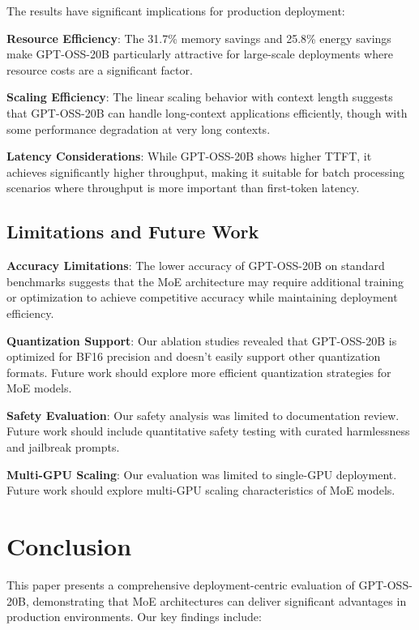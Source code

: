 \documentclass[11pt]{article}
\begin{document}
The results have significant implications for production deployment:

\textbf{Resource Efficiency}: The 31.7\% memory savings and 25.8\% energy savings make GPT-OSS-20B particularly attractive for large-scale deployments where resource costs are a significant factor.

\textbf{Scaling Efficiency}: The linear scaling behavior with context length suggests that GPT-OSS-20B can handle long-context applications efficiently, though with some performance degradation at very long contexts.

\textbf{Latency Considerations}: While GPT-OSS-20B shows higher TTFT, it achieves significantly higher throughput, making it suitable for batch processing scenarios where throughput is more important than first-token latency.

\subsection{Limitations and Future Work}

\textbf{Accuracy Limitations}: The lower accuracy of GPT-OSS-20B on standard benchmarks suggests that the MoE architecture may require additional training or optimization to achieve competitive accuracy while maintaining deployment efficiency.

\textbf{Quantization Support}: Our ablation studies revealed that GPT-OSS-20B is optimized for BF16 precision and doesn't easily support other quantization formats. Future work should explore more efficient quantization strategies for MoE models.

\textbf{Safety Evaluation}: Our safety analysis was limited to documentation review. Future work should include quantitative safety testing with curated harmlessness and jailbreak prompts.

\textbf{Multi-GPU Scaling}: Our evaluation was limited to single-GPU deployment. Future work should explore multi-GPU scaling characteristics of MoE models.

\section{Conclusion}

This paper presents a comprehensive deployment-centric evaluation of GPT-OSS-20B, demonstrating that MoE architectures can deliver significant advantages in production environments. Our key findings include:
\end{document}
